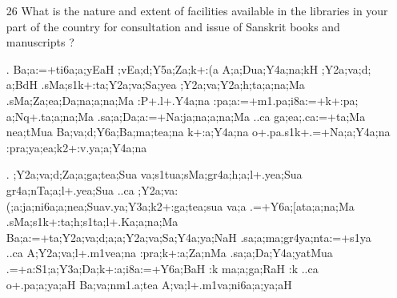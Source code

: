 {\begin{itemize}
\begin{itemize}
           \item[(b)] Is the work of collecting Sanskrit manuscripts adequately organised in your region ?
           
           \item[(c)] Is the condition of Sanskrit manuscripts in the manuscript libraries in your region satisfactory in respect of preservation and cataloguing ?
           
           \item[(d)] Are the facilities for the loan, copying, and preparation of photostats and microfilms of manuscripts and for the reading of microfilms adequate in those libraries ?
           
           \end{itemize} 

			\item[26] What is the nature and extent of facilities available in the libraries in your part of the country for consultation and issue of Sanskrit books and manuscripts ?
\end{itemize}
}

\begin{itemize}
\item[{\sktf 27}.] {\sktf Ba;a:=+ti6a;a;yEaH
;vEa;d;Y5a;Za;k+:(a
A;a;Dua;Y4a;na;kH ;Y2a;va;d;%
a;BdH .sMa;s1k+:ta;Y2a;va;Sa;yea
;Y2a;va;Y2a;h;ta;a;na;Ma .sMa;Za;ea;Da;na;a;na;Ma :P+.l+.Y4a;na \ZF{)} :pa;a:=+m1.pa;i8a:=+k+:pa;%
a;Nq+.ta;a;na;Ma \ZF{)}
.sa;a;Da;a:=+Na:ja;na;a;na;Ma ..ca ga;ea;.ca:=+ta;Ma nea;tMua
Ba;va;d;Y6a;Ba;ma;tea;na k+:a;Y4a;na o{+.pa}.s1k+.=+Na;a;Y4a;na :pra;ya;ea;k2+:v.ya;a;Y4a;na}

\item[{\sktf 28}.] {\sktf ;Y2a;va;d;Za;a;ga;tea;Sua
va;s1tua;sMa;gr4a;h;a;l+.yea;Sua gr4a;nTa;a;l+.yea;Sua ..ca
\ZF{(};Y2a;va:(;a:ja;ni6a;a;nea;Sua\break v.ya;Y3a;k2+:ga;tea;sua
va;a\ZF{)} .=+Y6a;[ata;a;na;Ma .sMa;s1k+:ta;h;s1ta;l+.Ka;a;na;Ma%
\ZF{,} Ba;a:=+ta;Y2a;va;d;a;a;Y2a;va;Sa;Y4a;ya;NaH
.sa;a;ma;gr4ya;nta:=+s1ya ..ca\ZF{,} A;Y2a;va;l+.m1vea;na :pra;k+:a;Za;nMa
.sa;a;Da{;Y4a;ya}{tMua} .=+a{:S1;a};Y3a;Da;k+:a;i8a:=+Y6a;BaH :k
ma;a;ga;RaH :k ..ca o+.pa;a;ya;aH
Ba;va;nm1.a;tea A;va;l+.m1va;ni6a;a;ya;aH}

\end{itemize}

